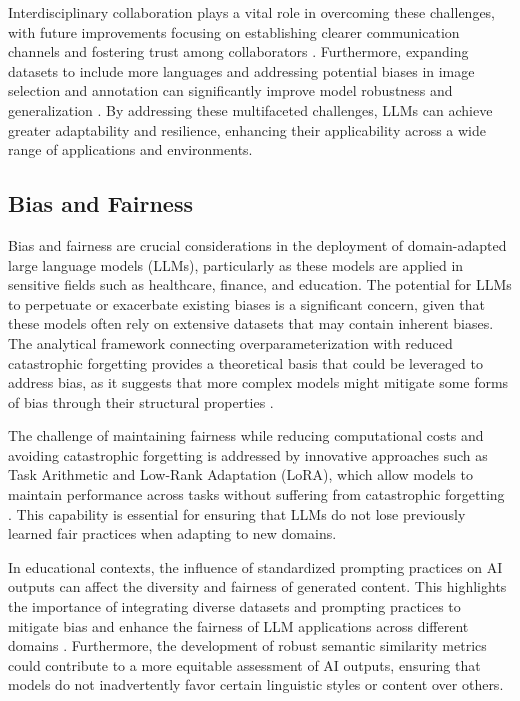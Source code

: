 Interdisciplinary collaboration plays a vital role in overcoming these challenges, with future improvements focusing on establishing clearer communication channels and fostering trust among collaborators \cite{pandy2024advancementsroboticsprocessautomation}. Furthermore, expanding datasets to include more languages and addressing potential biases in image selection and annotation can significantly improve model robustness and generalization \cite{thapliyal2022crossmodal3600massivelymultilingualmultimodal}. By addressing these multifaceted challenges, LLMs can achieve greater adaptability and resilience, enhancing their applicability across a wide range of applications and environments.



\subsection{Bias and Fairness} \label{subsec:Bias and Fairness}



Bias and fairness are crucial considerations in the deployment of domain-adapted large language models (LLMs), particularly as these models are applied in sensitive fields such as healthcare, finance, and education. The potential for LLMs to perpetuate or exacerbate existing biases is a significant concern, given that these models often rely on extensive datasets that may contain inherent biases. The analytical framework connecting overparameterization with reduced catastrophic forgetting provides a theoretical basis that could be leveraged to address bias, as it suggests that more complex models might mitigate some forms of bias through their structural properties \cite{goldfarb2022analysiscatastrophicforgettingrandom}.



The challenge of maintaining fairness while reducing computational costs and avoiding catastrophic forgetting is addressed by innovative approaches such as Task Arithmetic and Low-Rank Adaptation (LoRA), which allow models to maintain performance across tasks without suffering from catastrophic forgetting \cite{chitale2023taskarithmeticloracontinual}. This capability is essential for ensuring that LLMs do not lose previously learned fair practices when adapting to new domains.



In educational contexts, the influence of standardized prompting practices on AI outputs can affect the diversity and fairness of generated content. This highlights the importance of integrating diverse datasets and prompting practices to mitigate bias and enhance the fairness of LLM applications across different domains \cite{yamshchikov2020styletransferparaphraselookingsensible}. Furthermore, the development of robust semantic similarity metrics could contribute to a more equitable assessment of AI outputs, ensuring that models do not inadvertently favor certain linguistic styles or content over others.



